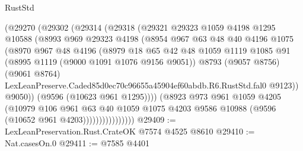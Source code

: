 \begin{lexlean}{RustStd}
\begin{coremodule}
                      (@29270
                        (@29302
                          (@29314
                            (@29318
                              (@29321
                                @29323
                                @1059
                                @4198
                                @1295
                                @10588
                                (@8993
                                  @969
                                  @29323
                                  @4198
                                  (@8954
                                    @967
                                    @63
                                    @48
                                    @40
                                    @4196
                                    @1075
                                    (@8970
                                      @967
                                      @48
                                      @4196
                                      (@8979
                                        @18
                                        @65
                                        @42
                                        @48
                                        @1059
                                        @1119
                                        @1085
                                        @91
                                        (@8995 @1119 (@9000 @1091 @1076 @9156 @9051))
                                        @8793
                                        (@9057 @8756)
                                        (@9061 @8764)
                                        LexLeanPreserve.Caded85d0ec70c96655a45904ef60abdb.R6.RustStd.fal0
                                        @9123))
                                    @9050))
                                (@9596 (@10623 @961 @1295))))
                            (@8923
                              @973
                              @961
                              @1059
                              @4205
                              (@10979
                                @106
                                @961
                                @63
                                @40
                                @1059
                                @1075
                                @4203
                                @9586
                                @10988
                                (@9596 (@10652 @961 @4203))))))))))))))))
@29409 := LexLeanPreservation.Rust.CrateOK @7574 @4525 @8610
@29410 := Nat.casesOn.{0}
@29411 := @7585 @4401

\end{coremodule}
\end{lexlean}
